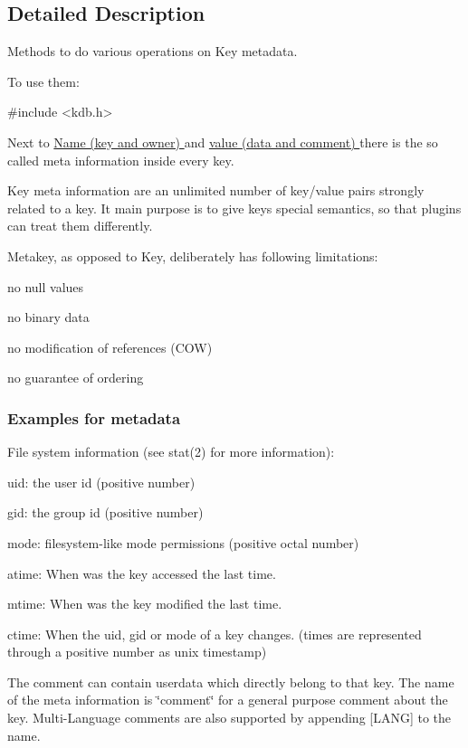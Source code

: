 \subsection{Detailed Description}
Methods to do various operations on Key metadata. 

To use them\+: 
\begin{DoxyCode}
\textcolor{preprocessor}{#include <kdb.h>}
\end{DoxyCode}


Next to \hyperlink{group__keyname}{Name (key and owner) } and \hyperlink{group__keyvalue}{value (data and comment) } there is the so called meta information inside every key.

Key meta information are an unlimited number of key/value pairs strongly related to a key. It main purpose is to give keys special semantics, so that plugins can treat them differently.

Metakey, as opposed to Key, deliberately has following limitations\+:
\begin{DoxyItemize}
\item no null values
\item no binary data
\item no modification of references (C\+OW)
\item no guarantee of ordering
\end{DoxyItemize}

\subsubsection*{Examples for metadata}

File system information (see stat(2) for more information)\+:
\begin{DoxyItemize}
\item uid\+: the user id (positive number)
\item gid\+: the group id (positive number)
\item mode\+: filesystem-\/like mode permissions (positive octal number)
\item atime\+: When was the key accessed the last time.
\item mtime\+: When was the key modified the last time.
\item ctime\+: When the uid, gid or mode of a key changes. (times are represented through a positive number as unix timestamp)
\end{DoxyItemize}

The comment can contain userdata which directly belong to that key. The name of the meta information is \char`\"{}comment\char`\"{} for a general purpose comment about the key. Multi-\/\+Language comments are also supported by appending \mbox{[}L\+A\+NG\mbox{]} to the name.

